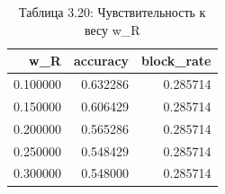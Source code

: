 \begin{table}[htbp]
\caption{Таблица 3.20: Чувствительность к весу w_R}
\label{tab:3_20}
\begin{tabular}{rrr}
\toprule
w\_R & accuracy & block\_rate \\
\midrule
0.100000 & 0.632286 & 0.285714 \\
0.150000 & 0.606429 & 0.285714 \\
0.200000 & 0.565286 & 0.285714 \\
0.250000 & 0.548429 & 0.285714 \\
0.300000 & 0.548000 & 0.285714 \\
\bottomrule
\end{tabular}
\end{table}
